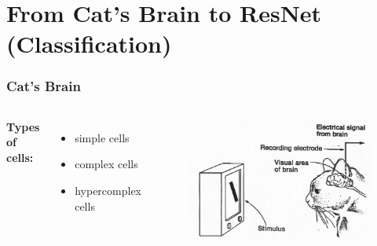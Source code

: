 \documentclass{beamer}
\begin{document}
\section{From Cat's Brain to ResNet (Classification)}
\begin{frame}
\frametitle{Cat's Brain}
\begin{columns}[c]
	\textbf{Types of cells:}
\begin{itemize}
	\item simple cells
	\item complex cells
	\item hypercomplex cells
\end{itemize}

\begin{figure}
	\includegraphics[width=\linewidth]{Pics/cats.jpg}
\end{figure}
\end{columns}
\end{frame}
\end{document}
